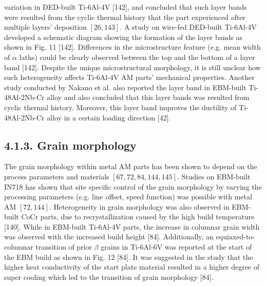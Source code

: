 \documentclass[10pt]{article}
\begin{document}
variation in DED-built Ti-6Al-4V [142], and concluded that such layer bands were resulted from the cyclic thermal history that the part experienced after multiple layers' deposition $[26,143]$. A study on wire-fed DED-built Ti-6Al-4V developed a schematic diagram showing the formation of the layer bands as shown in Fig. 11 [142]. Differences in the microstructure feature (e.g. mean width of $\alpha$ laths) could be clearly observed between the top and the bottom of a layer band [142]. Despite the unique microstructural morphology, it is still unclear how such heterogeneity affects Ti-6Al-4V AM parts' mechanical properties. Another study conducted by Nakano et al. also reported the layer band in EBM-built Ti-48Al-2Nb-Cr alloy and also concluded that this layer bands was resulted from cyclic thermal history. Moreover, this layer band improves the ductility of Ti-48Al-2Nb-Cr alloy in a certain loading direction [42].

\subsection*{4.1.3. Grain morphology}
The grain morphology within metal AM parts has been shown to depend on the process parameters and materials $[67,72,84,144,145]$. Studies on EBM-built IN718 has shown that site specific control of the grain morphology by varying the processing parameters (e.g. line offset, speed function) was possible with metal AM $[72,144]$. Heterogeneity in grain morphology was also observed in EBM-built CoCr parts, due to recrystallization caused by the high build temperature [140]. While in EBM-built Ti-6Al-4V parts, the increase in columnar grain width was observed with the increased build height [84]. Additionally, an equiaxed-to-columnar transition of prior $\beta$ grains in Ti-6Al-6V was reported at the start of the EBM build as shown in Fig. 12 [84]. It was suggested in the study that the higher heat conductivity of the start plate material resulted in a higher degree of super cooling which led to the transition of grain morphology [84].
\end{document}
